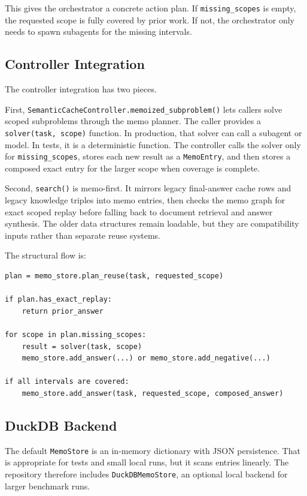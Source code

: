 \documentclass[11pt]{article}
\begin{document}
This gives the orchestrator a concrete action plan. If
\texttt{missing\_scopes} is empty, the requested scope is fully covered by
prior work. If not, the orchestrator only needs to spawn subagents for the
missing intervals.

\subsection{Controller Integration}

The controller integration has two pieces.

First, \texttt{SemanticCacheController.memoized\_subproblem()} lets callers
solve scoped subproblems through the memo planner. The caller provides a
\texttt{solver(task, scope)} function. In production, that solver can call a
subagent or model. In tests, it is a deterministic function. The controller
calls the solver only for \texttt{missing\_scopes}, stores each new result as a
\texttt{MemoEntry}, and then stores a composed exact entry for the larger scope
when coverage is complete.

Second, \texttt{search()} is memo-first. It mirrors legacy final-answer cache
rows and legacy knowledge triples into memo entries, then checks the memo graph
for exact scoped replay before falling back to document retrieval and answer
synthesis. The older data structures remain loadable, but they are compatibility
inputs rather than separate reuse systems.

The structural flow is:

\begin{verbatim}
plan = memo_store.plan_reuse(task, requested_scope)

if plan.has_exact_replay:
    return prior_answer

for scope in plan.missing_scopes:
    result = solver(task, scope)
    memo_store.add_answer(...) or memo_store.add_negative(...)

if all intervals are covered:
    memo_store.add_answer(task, requested_scope, composed_answer)
\end{verbatim}

\subsection{DuckDB Backend}

The default \texttt{MemoStore} is an in-memory dictionary with JSON
persistence. That is appropriate for tests and small local runs, but it scans
entries linearly. The repository therefore includes
\texttt{DuckDBMemoStore}, an optional local backend for larger benchmark runs.
\end{document}
